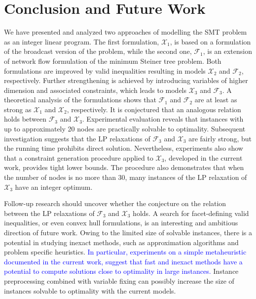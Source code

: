 \section{Conclusion and Future Work}
\label{sec:conclusion}
We have presented and analyzed two approaches of modelling the SMT problem as an integer linear program.
The first formulation, $\mathcal{X}_1$, is based on a formulation of the broadcast version of the problem, while the second one, $\mathcal{F}_1$, is an extension of network flow formulation of the minimum Steiner tree problem.
Both formulations are improved by valid inequalities resulting in models $\mathcal{X}_2$ and $\mathcal{F}_2$, respectively. 
Further strengthening is achieved by introducing variables of higher dimension and associated constraints, which leads to models $\mathcal{X}_3$ and $\mathcal{F}_3$.
A theoretical analysis of the formulations shows that  $\mathcal{F}_1$ and $\mathcal{F}_2$ are at least as strong as $\mathcal{X}_1$ and $\mathcal{X}_2$, respectively. 
It is conjectured that an analogous relation holds between $\mathcal{F}_3$ and $\mathcal{X}_3$.
Experimental evaluation reveals that instances with up to approximately 20 nodes are practically solvable to optimality.
Subsequent investigation suggests that the LP relaxations of $\mathcal{F}_3$ and $\mathcal{X}_3$ are fairly strong, but the running time prohibits direct solution.
Nevertheless, experiments also show that a constraint generation procedure applied to $\mathcal{X}_3$, developed in the current work, provides tight lower bounds.
The procedure also demonstrates that when the number of nodes is no more than 30, many instances of the LP relaxation of $\mathcal{X}_3$ have an integer optimum.

Follow-up research should uncover whether the conjecture on the relation between the LP relaxations of $\mathcal{F}_3$ and $\mathcal{X}_3$ holds.
A search for facet-defining valid inequalities, or even convex hull formulations, is an interesting and ambitious direction of future work.
Owing to the limited size of solvable instances, there is a potential in studying inexact methods, such as approximation algorithms and problem specific heuristics.
\textcolor{blue}{In particular, experiments on a simple metaheuristic documented in the current work, suggest that fast and inexact methods have a potential to compute solutions close to optimality in large instances.}
Instance preprocessing combined with variable fixing can possibly increase the size of instances solvable to optimality with the current models.

